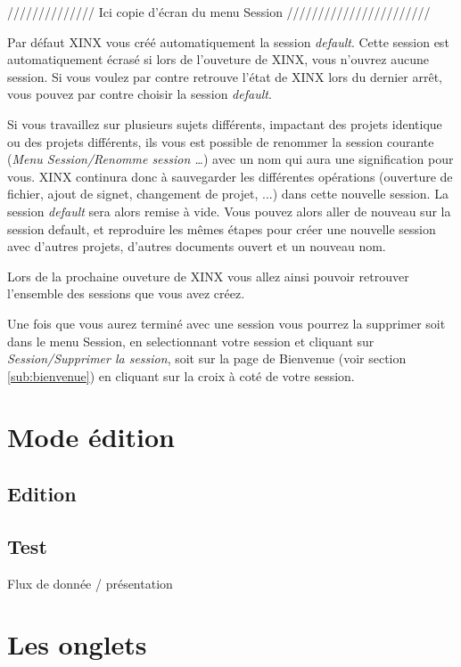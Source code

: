 \documentclass[a4paper,10pt,twoside]{book}
\begin{document}
////////////// Ici copie d'écran du menu Session ///////////////////////

Par défaut XINX vous créé automatiquement la session \emph{default}. Cette session est automatiquement écrasé si lors de l'ouveture de XINX, vous n'ouvrez aucune session.  Si vous voulez par contre retrouve l'état de XINX lors du dernier arrêt, vous pouvez par contre choisir la session \emph{default}.

Si vous travaillez sur plusieurs sujets différents, impactant des projets identique ou des projets différents, ils vous est possible de renommer la session courante (\emph{Menu Session/Renomme session \dots}) avec un nom qui aura une signification pour vous. XINX continura donc à sauvegarder les différentes opérations (ouverture de fichier, ajout de signet, changement de projet, ...) dans cette nouvelle session. La session \emph{default} sera alors remise à vide.
Vous pouvez alors aller de nouveau sur la session default, et reproduire les mêmes étapes pour créer une nouvelle session avec d'autres projets, d'autres documents ouvert et un nouveau nom.

Lors de la prochaine ouveture de XINX vous allez ainsi pouvoir retrouver l'ensemble des sessions que vous avez créez.

Une fois que vous aurez terminé avec une session vous pourrez la supprimer soit dans le menu Session, en selectionnant votre session et cliquant sur \emph{Session/Supprimer la session}, soit sur la page de Bienvenue (voir section \ref{sub:bienvenue}) en cliquant sur la croix à coté de votre session.

\section{Mode édition}

\subsection{Edition}

\subsection{Test}

Flux de donnée / présentation

\section{Les onglets}
\label{sec:dock}
\end{document}
